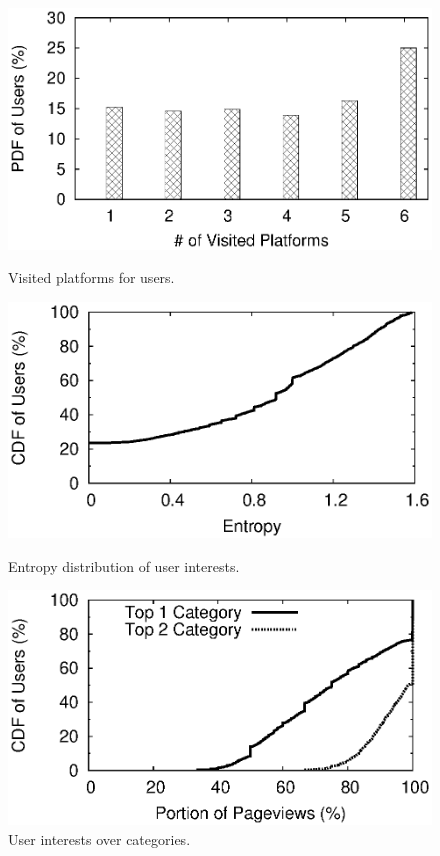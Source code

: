 \begin{figure}[t]
\begin{minipage}{0.32\textwidth}
 \centering
	\includegraphics[width=1\textwidth]{plots/users/hist_user_platform.eps}
	\caption{Visited platforms for users.}
	\label{fig:hist_user_platform}
\end{minipage}
\hfill
\begin{minipage}{0.32\textwidth}
 \centering
	\includegraphics[width=1\textwidth]{plots/users/cdf_entropy.eps}
	\caption{Entropy distribution of user interests.}
	\label{fig:cdf_entropy}
\end{minipage}
\hfill
\begin{minipage}{0.32\textwidth}
 \centering
	\includegraphics[width=1\textwidth]{plots/users/cdf_top.eps}
	\caption{User interests over categories.}
	\label{fig:cdf_top}
\end{minipage}
\end{figure}

